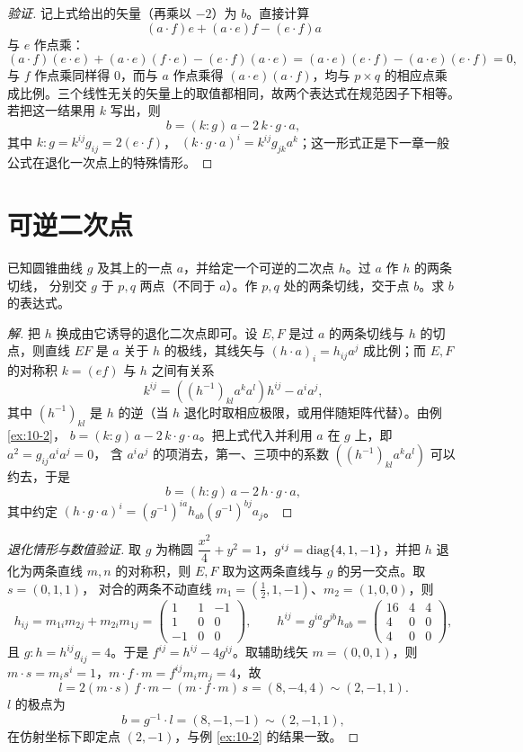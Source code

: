 \begin{proof}[验证]
记上式给出的矢量（再乘以 $-2$）为 $b$。直接计算
\[
(a\cdot f)e+(a\cdot e)f-(e\cdot f)a
\]
与 $e$ 作点乘：
\[
(a\cdot f)(e\cdot e)+(a\cdot e)(f\cdot e)-(e\cdot f)(a\cdot e)
=(a\cdot e)(e\cdot f)-(a\cdot e)(e\cdot f)=0,
\]
与 $f$ 作点乘同样得 $0$，而与 $a$ 作点乘得 $(a\cdot e)(a\cdot f)$，均与 $p\times q$ 的相应点乘
成比例。三个线性无关的矢量上的取值都相同，故两个表达式在规范因子下相等。若把这一结果用 $k$
写出，则
\[
b=(k:g)\,a-2\,k\cdot g\cdot a ,
\]
其中 $k:g=k^{ij}g_{ij}=2(e\cdot f)$，
$(k\cdot g\cdot a)^i=k^{ij}g_{jk}a^k$；这一形式正是下一章一般公式在退化一次点上的特殊情形。
\end{proof}

\section{可逆二次点}

\begin{example}\label{ex:10-3}
已知圆锥曲线 $g$ 及其上的一点 $a$，并给定一个可逆的二次点 $h$。过 $a$ 作 $h$ 的两条切线，
分别交 $g$ 于 $p,q$ 两点（不同于 $a$）。作 $p,q$ 处的两条切线，交于点 $b$。求 $b$ 的表达式。
\end{example}

\begin{proof}[解]
把 $h$ 换成由它诱导的退化二次点即可。设 $E,F$ 是过 $a$ 的两条切线与 $h$ 的切点，则直线 $EF$
是 $a$ 关于 $h$ 的极线，其线矢与 $(h\cdot a)_i=h_{ij}a^j$ 成比例；而 $E,F$ 的对称积
$k=(ef)$ 与 $h$ 之间有关系
\[
k^{ij}=\left((h^{-1})_{kl}a^ka^l\right)h^{ij}-a^ia^j ,
\]
其中 $(h^{-1})_{kl}$ 是 $h$ 的逆（当 $h$ 退化时取相应极限，或用伴随矩阵代替）。由例 \ref{ex:10-2}，
$b=(k:g)\,a-2\,k\cdot g\cdot a$。把上式代入并利用 $a$ 在 $g$ 上，即 $a^2=g_{ij}a^ia^j=0$，
含 $a^ia^j$ 的项消去，第一、三项中的系数 $\left((h^{-1})_{kl}a^ka^l\right)$ 可以约去，于是
\[
b=(h:g)\,a-2\,h\cdot g\cdot a ,
\]
其中约定 $(h\cdot g\cdot a)^i=(g^{-1})^{ia}h_{ab}(g^{-1})^{bj}a_j$。
\end{proof}

\begin{proof}[退化情形与数值验证]
取 $g$ 为椭圆 $\dfrac{x^2}{4}+y^2=1$，$g^{ij}=\operatorname{diag}\{4,1,-1\}$，并把 $h$ 退化为两条直线
$m,n$ 的对称积，则 $E,F$ 取为这两条直线与 $g$ 的另一交点。取 $s=(0,1,1)$，
对合的两条不动直线 $m_1=(\tfrac12,1,-1)$、$m_2=(1,0,0)$，则
\[
h_{ij}=m_{1i}m_{2j}+m_{2i}m_{1j}
=\begin{pmatrix}1&1&-1\\1&0&0\\-1&0&0\end{pmatrix},
\qquad
h^{ij}=g^{ia}g^{jb}h_{ab}
=\begin{pmatrix}16&4&4\\4&0&0\\4&0&0\end{pmatrix},
\]
且 $g:h=h^{ij}g_{ij}=4$。于是 $f^{ij}=h^{ij}-4g^{ij}$。取辅助线矢 $m=(0,0,1)$，则
$m\cdot s=m_is^i=1$，$m\cdot f\cdot m=f^{ij}m_im_j=4$，故
\[
l=2(m\cdot s)\,f\cdot m-(m\cdot f\cdot m)\,s=(8,-4,4)\sim(2,-1,1).
\]
$l$ 的极点为
\[
b=g^{-1}\cdot l=(8,-1,-1)\sim(2,-1,1),
\]
在仿射坐标下即定点 $(2,-1)$，与例 \ref{ex:10-2} 的结果一致。
\end{proof}

